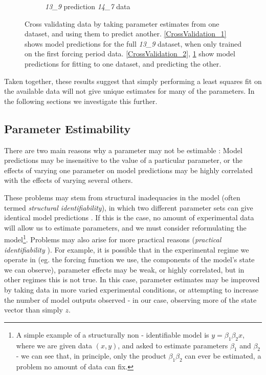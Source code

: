 \documentclass[10pt,journal]{./IEEE_latex_class/IEEEtran}
\begin{document}
\begin{figure}[h!]
\begin{subfigure}[h]{0.49\textwidth}
        \caption{\textit{13\_9} prediction \textit{14\_7} data}
        \label{CrossValidation_3} 
    \end{subfigure}
    \caption{Cross validating data by taking parameter estimates from one dataset, and using them to predict another. \ref{CrossValidation_1} shows model predictions for the full \textit{13\_9} dataset, when only trained on the first forcing period data. \ref{CrossValidation_2}, \ref{CrossValidation_3} show model predictions for fitting to one dataset, and predicting the other.}
\label{CrossValidation}   
\end{figure}

 Taken together, these results suggest that simply performing a least squares fit on the available data will not give unique estimates for many of the parameters. In the following sections we investigate this further.
 
 \subsection{Parameter Estimability}
\label{Parameter Estimability}
 
 There are two main reasons why a parameter may not be estimable \cite{Mclean2012,Yao2003, Beck,Jimenez-Hornero2008,Grewal1976}: Model predictions may be insensitive to the value of a particular parameter, or the effects of varying one parameter on model predictions may be highly correlated with the effects of varying several others.
 
These problems may stem from structural inadequacies in the model (often termed \textit{structural identifiability}), in which two different parameter sets can give identical model predictions \cite{Jimenez-Hornero2008,Grewal1976 }. If this is the case, no amount of experimental data will allow us to estimate parameters, and we must consider reformulating the model\footnote{A simple example of a structurally non - identifiable model is $y = \beta_{1}\beta_{2}x$, where we are given data $(x,y)$, and asked to estimate parameters $\beta_{1}$ and $\beta_{2}$ - we can see that, in principle, only the product $\beta_{1}\beta_{2}$ can ever be estimated, a problem no amount of data can fix.}. Problems may also arise for more practical reasons (\textit{practical identifiability} \cite{Mclean2012}). For example, it is possible that in the experimental regime we operate in (eg. the forcing function we use, the components of the model's state we can observe), parameter effects may be weak, or highly correlated, but in other regimes this is not true. In this case, parameter estimates may be improved by taking data in more varied experimental conditions, or attempting to increase the number of model outputs observed - in our case, observing more of the state vector than simply $z$. 
 
\end{document}
